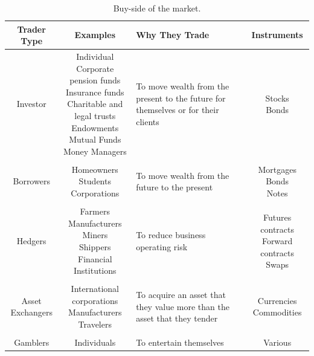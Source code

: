\documentclass[../TGMAFFIRO]{subfiles}
\begin{document}
\begin{table}[!h] \label{table:buy-side}
	\centering
	\begin{tabular}{ c c m{3cm} c}
		\hline
		Trader Type & Examples & Why They Trade & Instruments\\
		\hline
		Investor & \breakcell{Individual \\ Corporate pension funds \\ Insurance funds \\ Charitable and legal trusts \\ Endowments \\ Mutual Funds \\ Money Managers} & {To move wealth from the present to the future for themselves or for their clients} & \breakcell{Stocks \\ Bonds} \\
		\\
		Borrowers & \breakcell{Homeowners \\ Students \\ Corporations} & {To move wealth from the future to the present} & \breakcell{Mortgages \\ Bonds \\ Notes}\\
		\\
		Hedgers & \breakcell{Farmers \\ Manufacturers \\ Miners \\ Shippers \\ Financial Institutions} & {To reduce business operating risk} & \breakcell{Futures contracts \\ Forward contracts \\ Swaps}\\
		\\
		\breakcell{Asset \\ Exchangers} & \breakcell{International corporations \\ Manufacturers \\ Travelers} & {To acquire an asset that they value more than the asset that they tender} & \breakcell{Currencies \\ Commodities} \\
		\\
		Gamblers & Individuals & {To entertain themselves} & Various\\
		\hline
	\end{tabular}
	\caption{Buy-side of the market. }
\end{table}
\end{document}

